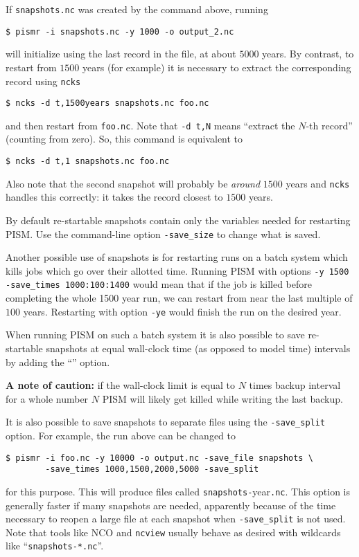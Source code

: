 If \texttt{snapshots.nc} was created by the command above, running
\begin{verbatim}
$ pismr -i snapshots.nc -y 1000 -o output_2.nc
\end{verbatim}
will initialize using the last record in the file, at about $5000$ years.  By contrast, to restart from $1500$ years (for example) it is necessary to extract the corresponding record using \texttt{ncks}
\begin{verbatim}
$ ncks -d t,1500years snapshots.nc foo.nc
\end{verbatim}
and then restart from \texttt{foo.nc}.  Note that \texttt{-d t,N} means ``extract the $N$-th record'' (counting from zero).  So, this command is equivalent to
\begin{verbatim}
$ ncks -d t,1 snapshots.nc foo.nc
\end{verbatim}
Also note that the second snapshot will probably be \emph{around} $1500$ years and \texttt{ncks} handles this correctly: it takes the record closest to $1500$ years.

By default re-startable snapshots contain only the variables needed for
restarting PISM. Use the command-line option \texttt{-save_size} to change what is saved.

Another possible use of snapshots is for restarting runs on a batch system which kills jobs which go over their allotted time.  Running PISM with options \texttt{-y 1500} \texttt{-save_times 1000:100:1400} would mean that if the job is killed before completing the whole 1500 year run, we can restart from near the last multiple of $100$ years.  Restarting with option \texttt{-ye} would finish the run on the desired year.

When running PISM on such a batch system it is also possible to save
re-startable snapshots at equal wall-clock time (as opposed to model time)
intervals by adding the ``'' option.

\textbf{A note of caution:} if the wall-clock limit is equal to $N$ times backup
interval for a whole number $N$ PISM will likely get killed while writing the
last backup.

It is also possible to save snapshots to separate files using the
\texttt{-save_split} option.  For example, the run above can be changed to
\begin{verbatim}
$ pismr -i foo.nc -y 10000 -o output.nc -save_file snapshots \
        -save_times 1000,1500,2000,5000 -save_split
\end{verbatim}
for this purpose.  This will produce files called
\texttt{snapshots-}year\texttt{.nc}.  This option is generally faster if many
snapshots are needed, apparently because of the time necessary to reopen a
large file at each snapshot when \texttt{-save_split} is not used.  Note
that tools like NCO\index{NCO (NetCDF Operators)!wildcards} and
\texttt{ncview} usually behave as desired with wildcards like ``\texttt{snapshots-*.nc}''.

